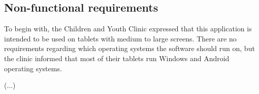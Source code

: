 \subsection{Non-functional requirements}

To begin with, the Children and Youth Clinic expressed that this application is intended to be used on tablets with medium to large screens. There are no requirements regarding which operating systems the software should run on, but the clinic informed that most of their tablets run Windows and Android operating systems.

(...)

